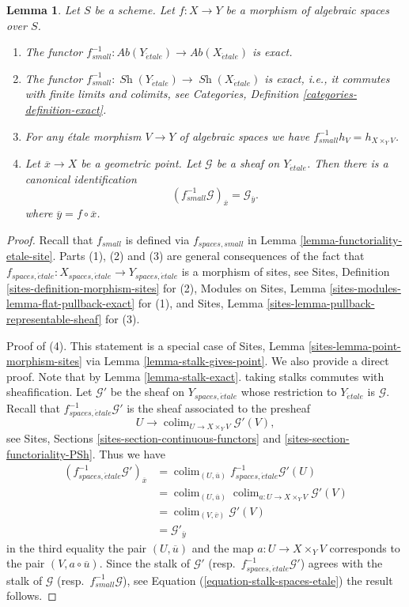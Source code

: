 \documentclass[10pt,a4paper]{amsart}
\theoremstyle{plain}
\newtheorem{lemma}[subsection]{Lemma}
\theoremstyle{definition}
\theoremstyle{remark}
\numberwithin{equation}{subsection}
\def\colim{\mathop{\mathrm{colim}}\nolimits}
\def\Sh{\mathop{\mathit{Sh}}\nolimits}
\def\etale{{\acute{e}tale}}
\begin{document}
\begin{lemma}
\label{lemma-stalk-pullback}
Let $S$ be a scheme.
Let $f : X \to Y$ be a morphism of algebraic spaces over $S$.
\begin{enumerate}
\item The functor
$f_{small}^{-1} :
\textit{Ab}(Y_\etale)
\to
\textit{Ab}(X_\etale)$
is exact.
\item The functor
$f_{small}^{-1} :
\Sh(Y_\etale)
\to
\Sh(X_\etale)$
is exact, i.e., it commutes with finite limits and colimits, see
Categories, Definition \ref{categories-definition-exact}.
\item For any \'etale morphism $V \to Y$ of algebraic spaces
we have $f_{small}^{-1}h_V = h_{X \times_Y V}$.
\item Let $\overline{x} \to X$ be a geometric point.
Let $\mathcal{G}$ be a sheaf on $Y_\etale$.
Then there is a canonical identification
$$
(f_{small}^{-1}\mathcal{G})_{\overline{x}} = \mathcal{G}_{\overline{y}}.
$$
where $\overline{y} = f \circ \overline{x}$.
\end{enumerate}
\end{lemma}

\begin{proof}
Recall that $f_{small}$ is defined via $f_{spaces, small}$ in
Lemma \ref{lemma-functoriality-etale-site}.
Parts (1), (2) and (3) are general consequences of the fact that
$f_{spaces, \etale} :
X_{spaces, \etale}
\to
Y_{spaces, \etale}$
is a morphism of sites, see
Sites, Definition \ref{sites-definition-morphism-sites}
for (2),
Modules on Sites, Lemma \ref{sites-modules-lemma-flat-pullback-exact}
for (1), and
Sites, Lemma \ref{sites-lemma-pullback-representable-sheaf}
for (3).

\medskip\noindent
Proof of (4). This statement is a special case of
Sites, Lemma \ref{sites-lemma-point-morphism-sites}
via
Lemma \ref{lemma-stalk-gives-point}.
We also provide a direct proof. Note that by
Lemma \ref{lemma-stalk-exact}.
taking stalks commutes with sheafification.
Let $\mathcal{G}'$ be the sheaf on $Y_{spaces, \etale}$ whose restriction
to $Y_\etale$ is $\mathcal{G}$.
Recall that $f_{spaces, \etale}^{-1}\mathcal{G}'$ is the sheaf
associated to the presheaf
$$
U \longrightarrow \colim_{U \to X \times_Y V} \mathcal{G}'(V),
$$
see
Sites, Sections \ref{sites-section-continuous-functors} and
\ref{sites-section-functoriality-PSh}.
Thus we have
\begin{align*}
(f_{spaces, \etale}^{-1}\mathcal{G}')_{\overline{x}}
& =
\colim_{(U, \overline{u})} f_{spaces, \etale}^{-1}\mathcal{G}'(U)
\\
& = \colim_{(U, \overline{u})}
\colim_{a : U \to X \times_Y V} \mathcal{G}'(V) \\
& = \colim_{(V, \overline{v})} \mathcal{G}'(V) \\
& = \mathcal{G}'_{\overline{y}}
\end{align*}
in the third equality the pair $(U, \overline{u})$ and the map
$a : U \to X \times_Y V$ corresponds to the pair $(V, a \circ \overline{u})$.
Since the stalk of $\mathcal{G}'$
(resp.\ $f_{spaces, \etale}^{-1}\mathcal{G}'$)
agrees with the stalk of $\mathcal{G}$ (resp.\ $f_{small}^{-1}\mathcal{G}$),
see
Equation (\ref{equation-stalk-spaces-etale})
the result follows.
\end{proof}
\end{document}
